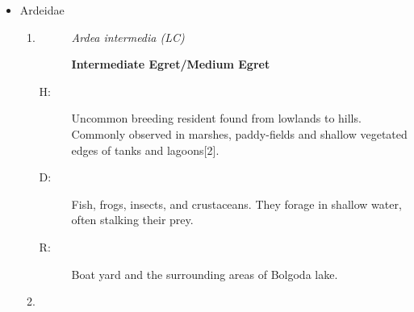 \begin{itemize}
\begin{enumerate}
\begin{description}%
\item[H: ]%
Common breeding resident found throughout Sri Lanka. Roosts and breeds inside cav{[}2{]}.%
\item[D: ]%
Diet comprises a variety of insects, including flies, wasps, bees, cicadas, flying termites, beetles, grasshoppers, airborne spiders, and butterflies.%
\item[R: ]%
Surrounding woody areas of the university playground.%
\end{description}%
\item%
\begin{description}%
\item[]%
\textit{ Apus affinis (LC)}%
\item[]%
\textbf{Little Swift/House Swift}%
\end{description}%
\begin{description}%
\item[H: ]%
Fairly common breeding resident rather locally from lowlands up to high hills{[}2{]}.%
\item[D: ]%
Diet mainly consists of flying insects.%
\item[R: ]%
Observed in flight near ENTC Building.%
\end{description}%
\end{enumerate}%
\item%
Ardeidae%
\begin{enumerate}%
\item%
\begin{description}%
\item[]%
\textit{Ardea intermedia (LC)}%
\item[]%
\textbf{Intermediate Egret/Medium Egret}%
\end{description}%
\begin{description}%
\item[H: ]%
Uncommon breeding resident found from lowlands to hills. Commonly observed in marshes, paddy-fields and shallow vegetated edges of tanks and lagoons{[}2{]}.%
\item[D: ]%
Fish, frogs, insects, and crustaceans. They forage in shallow water, often stalking their prey.%
\item[R: ]%
Boat yard and the surrounding areas of Bolgoda lake.%
\end{description}%
\item%
\begin{description}%
\item[]%

\end{description}
\end{enumerate}
\end{itemize}
